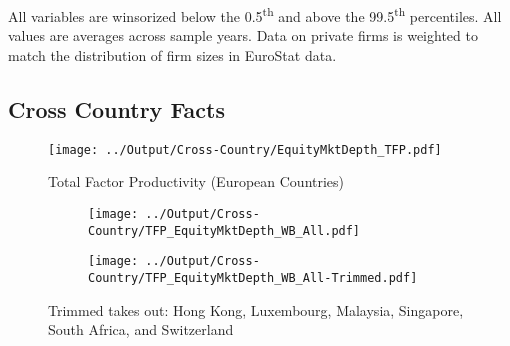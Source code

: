\documentclass[12pt,notitlepage]{article}
\begin{document}
\begin{table}[!htpb]
\caption{French Summary Statistics}

All variables are winsorized below the 0.5\textsuperscript{th} and above the 99.5\textsuperscript{th} percentiles. All values are averages across sample years. Data on private firms is weighted to match the distribution of firm sizes in EuroStat data.
\end{table}




\clearpage



\FloatBarrier
\subsection{Cross Country Facts} %
\label{sec:cross_country_facts}
\FloatBarrier



\begin{figure}[!htpb]
\centering
\caption{Total Factor Productivity (European Countries)}
 \texttt{[image: ../Output/Cross-Country/EquityMktDepth\_TFP.pdf]}
\end{figure}
\FloatBarrier




\begin{figure}[!htpb]
\centering
\caption{Total Factor Productivity (All Countries)}
\begin{subfigure}{.49\textwidth}
    \centering
 \texttt{[image: ../Output/Cross-Country/TFP\_EquityMktDepth\_WB\_All.pdf]}
\end{subfigure}
\begin{subfigure}{.49\textwidth}
    \centering
  \texttt{[image: ../Output/Cross-Country/TFP\_EquityMktDepth\_WB\_All-Trimmed.pdf]}
\end{subfigure}
Trimmed takes out: Hong Kong, Luxembourg, Malaysia, Singapore, South Africa, and Switzerland
\end{figure}
\end{document}
